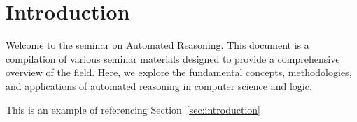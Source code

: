 \section*{Introduction}
\label{sec:introduction}

Welcome to the seminar on Automated Reasoning. This document is a compilation of various seminar materials designed to provide a comprehensive overview of the field. Here, we explore the fundamental concepts, methodologies, and applications of automated reasoning in computer science and logic.

This is an example of referencing Section~\ref{sec:introduction}